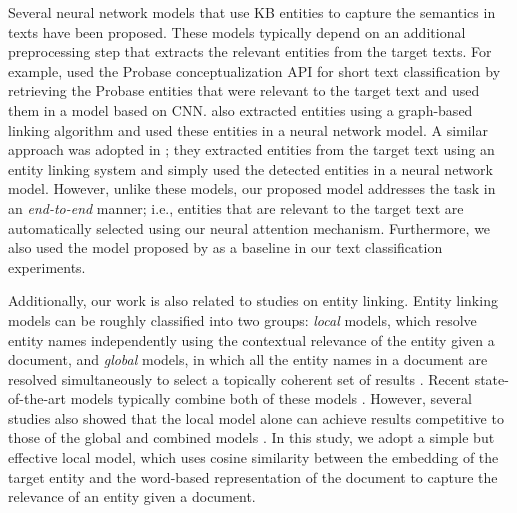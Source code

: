 \documentclass[11pt,a4paper]{article}
\begin{document}
    Several neural network models that use KB entities to capture the semantics in texts have been proposed.
    These models typically depend on an additional preprocessing step that extracts the relevant entities from the target texts.
    For example,  used the Probase conceptualization API for short text classification by retrieving the Probase entities that were relevant to the target text and used them in a model based on CNN.
     also extracted entities using a graph-based linking algorithm and used these entities in a neural network model.
    A similar approach was adopted in ; they extracted entities from the target text using an entity linking system and simply used the detected entities in a neural network model.
    However, unlike these models, our proposed model addresses the task in an \textit{end-to-end} manner; i.e.,
    entities that are relevant to the target text are automatically selected using our neural attention mechanism.
    Furthermore, we also used the model proposed by  as a baseline in our text classification experiments.

    Additionally, our work is also related to studies on entity linking.
    Entity linking models can be roughly classified into two groups: \textit{local} models, which resolve entity names independently using the contextual relevance of the entity given a document, and \textit{global} models, in which all the entity names in a document are resolved simultaneously to select a topically coherent set of results \cite{Ratinov2011}.
    Recent state-of-the-art models typically combine both of these models \cite{Yamada2016,ganea-hofmann:2017:EMNLP2017,cao-EtAl:2018:C18-1,kolitsas-ganea-hofmann:2018:K18-1}.
    However, several studies also showed that the local model alone can achieve results competitive to those of the global and combined models \cite{eshel-EtAl:2017:CoNLL,ganea-hofmann:2017:EMNLP2017,TACL1065,cao-EtAl:2018:C18-1,kolitsas-ganea-hofmann:2018:K18-1}.
    In this study, we adopt a simple but effective local model, which uses cosine similarity between the embedding of the target entity and the word-based representation of the document to capture the relevance of an entity given a document.
\end{document}

